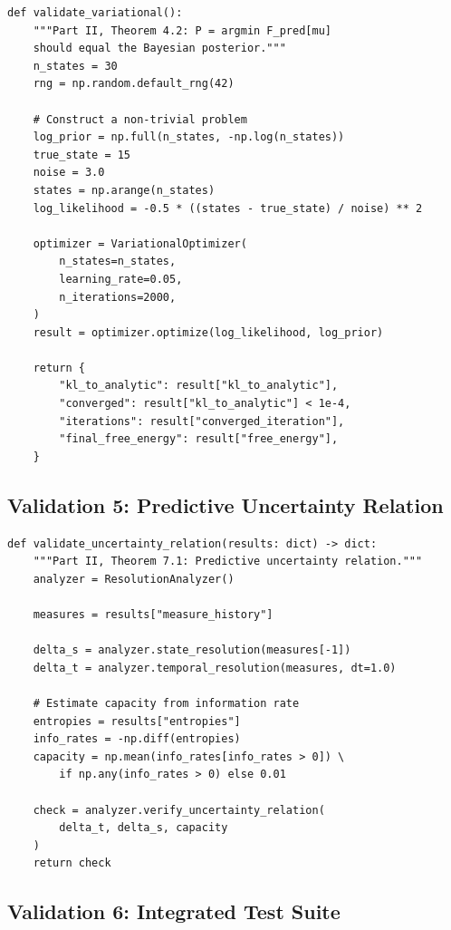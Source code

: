 \documentclass[12pt,a4paper]{article}
\theoremstyle{definition}
\begin{document}
\begin{lstlisting}[caption={Validation: Variational optimizer convergence},label=lst:val4]
def validate_variational():
    """Part II, Theorem 4.2: P = argmin F_pred[mu]
    should equal the Bayesian posterior."""
    n_states = 30
    rng = np.random.default_rng(42)
    
    # Construct a non-trivial problem
    log_prior = np.full(n_states, -np.log(n_states))
    true_state = 15
    noise = 3.0
    states = np.arange(n_states)
    log_likelihood = -0.5 * ((states - true_state) / noise) ** 2
    
    optimizer = VariationalOptimizer(
        n_states=n_states,
        learning_rate=0.05,
        n_iterations=2000,
    )
    result = optimizer.optimize(log_likelihood, log_prior)
    
    return {
        "kl_to_analytic": result["kl_to_analytic"],
        "converged": result["kl_to_analytic"] < 1e-4,
        "iterations": result["converged_iteration"],
        "final_free_energy": result["free_energy"],
    }
\end{lstlisting}

\subsection{Validation 5: Predictive Uncertainty Relation}

\begin{lstlisting}[caption={Validation: Uncertainty relation $\Delta_T \cdot \Delta_S \geq 1/\mathcal{C}$},label=lst:val5]
def validate_uncertainty_relation(results: dict) -> dict:
    """Part II, Theorem 7.1: Predictive uncertainty relation."""
    analyzer = ResolutionAnalyzer()
    
    measures = results["measure_history"]
    
    delta_s = analyzer.state_resolution(measures[-1])
    delta_t = analyzer.temporal_resolution(measures, dt=1.0)
    
    # Estimate capacity from information rate
    entropies = results["entropies"]
    info_rates = -np.diff(entropies)
    capacity = np.mean(info_rates[info_rates > 0]) \
        if np.any(info_rates > 0) else 0.01
    
    check = analyzer.verify_uncertainty_relation(
        delta_t, delta_s, capacity
    )
    return check
\end{lstlisting}

\subsection{Validation 6: Integrated Test Suite}
\end{document}
